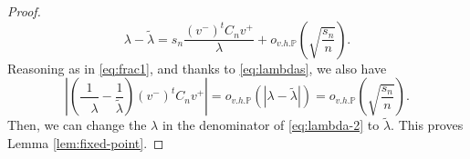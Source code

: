 \documentclass[10pt,a4paper]{amsart}
\newcommand{\centered}{C_n}
\newcommand{\ohp}{o_{v.h.\p}}
\newcommand{\p}{\mathbb{P}}
\newcommand{\scaling}{s_n}
\begin{document}
\begin{proof}
\begin{equation}
        \lambda -\tilde{\lambda}=\scaling\frac{(v^-)^t \centered v^+}{\lambda}+\ohp\left(\sqrt{\frac{\scaling}{n}}\right).
    \end{equation}
 Reasoning as in \eqref{eq:frac1}, and thanks to \eqref{eq:lambdas}, we also have 
 \begin{equation}
     \left|\left(\frac{1}{\phantom{\tilde\lambda} \!\!\!\!\!\ \lambda}-\frac{1}{\tilde\lambda}\right)(v^-)^t \centered v^+\right| = \ohp(|\lambda-\tilde\lambda|)=\ohp\left(\sqrt{\frac{\scaling}{n}}\right).
 \end{equation} 
Then, we can change the $\lambda$ in the denominator of \eqref{eq:lambda-2} to $\tilde \lambda$. This proves Lemma \ref{lem:fixed-point}.
\end{proof}
\end{document}
